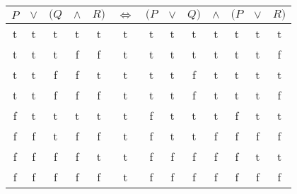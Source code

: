 \documentclass[leqno]{article}
\renewcommand{\iff}{\Leftrightarrow}
\begin{document}
\begin{enumerate}
\begin{tabular}{ccccccccccccc}
  \hline
  $P$ & $\lor$ & $(Q$ & $\land$ & $R)$ & $\iff$ & $(P$ & $\lor$ & $Q)$ & $\land$ & $(P$ & $\lor$ & $R)$ \\
  \hline
   t  &    t   &   t  &    t    &  t   &    t   &   t  &    t   &  t   &    t    &   t  &    t   &  t   \\
   t  &    t   &   t  &    f    &  f   &    t   &   t  &    t   &  t   &    t    &   t  &    t   &  f   \\
   t  &    t   &   f  &    f    &  t   &    t   &   t  &    t   &  f   &    t    &   t  &    t   &  t   \\
   t  &    t   &   f  &    f    &  f   &    t   &   t  &    t   &  f   &    t    &   t  &    t   &  f   \\
   f  &    t   &   t  &    t    &  t   &    t   &   f  &    t   &  t   &    t    &   f  &    t   &  t   \\
   f  &    f   &   t  &    f    &  f   &    t   &   f  &    t   &  t   &    f    &   f  &    f   &  f   \\
   f  &    f   &   f  &    f    &  t   &    t   &   f  &    f   &  f   &    f    &   f  &    t   &  t   \\
   f  &    f   &   f  &    f    &  f   &    t   &   f  &    f   &  f   &    f    &   f  &    f   &  f   \\
  \hline
\end{tabular}
\end{enumerate}
\end{document}
